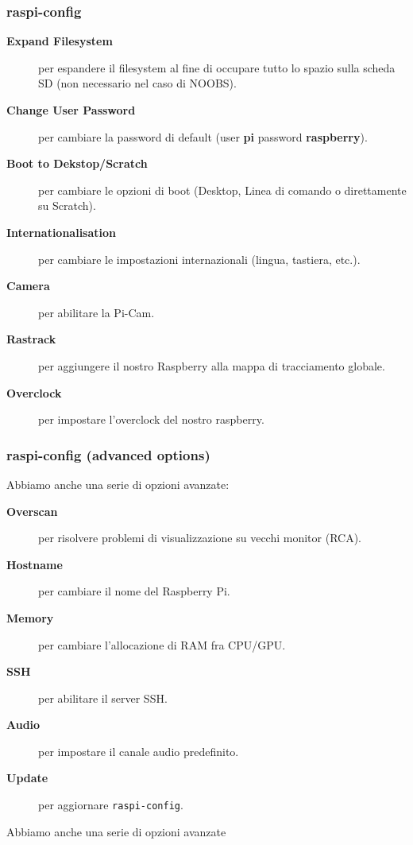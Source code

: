 \documentclass[xcolor=svgnames,11pt]{beamer}
\begin{document}
\begin{frame}\frametitle{raspi-config}
\begin{small}
\begin{description}
  \item[\textbf{Expand Filesystem}] per espandere il filesystem al fine di occupare tutto lo spazio sulla scheda SD (non necessario nel caso di NOOBS).
  \item[\textbf{Change User Password}] per cambiare la password di default (user \textbf{pi} password \textbf{raspberry}).
  \item[\textbf{Boot to Dekstop/Scratch}] per cambiare le opzioni di boot (Desktop, Linea di comando o direttamente su Scratch).
  \item[\textbf{Internationalisation}] per cambiare le impostazioni internazionali (lingua, tastiera, etc.).
  \item[\textbf{Camera}] per abilitare la Pi-Cam.
  \item[\textbf{Rastrack}] per aggiungere il nostro Raspberry alla mappa di tracciamento globale.
  \item[\textbf{Overclock}] per impostare l'overclock del nostro raspberry.
\end{description}
\end{small}
\end{frame}

\begin{frame}\frametitle{raspi-config (advanced options)}
Abbiamo anche una serie di opzioni avanzate:
\begin{description}
  \item[\textbf{Overscan}] per risolvere problemi di visualizzazione su vecchi monitor (RCA).
  \item[\textbf{Hostname}] per cambiare il nome del Raspberry Pi.
  \item[\textbf{Memory}] per cambiare l'allocazione di RAM fra CPU/GPU.
  \item[\textbf{SSH}] per abilitare il server SSH.
  \item[\textbf{Audio}] per impostare il canale audio predefinito.
  \item[\textbf{Update}] per aggiornare \texttt{raspi-config}.
\end{description}
\medskip
Abbiamo anche una serie di opzioni avanzate
\end{frame}

\end{document}
